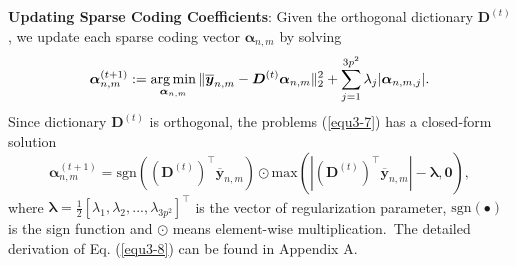 \vspace{2mm}
\textbf{Updating Sparse Coding Coefficients}: Given the orthogonal dictionary $\bm{D}^{(t)}$, we update each sparse coding vector $\bm{\alpha}_{n,m}$ by solving
\vspace{-2mm}
\begin{equation}\label{equ3-7}
\vspace{-2mm}
\begin{split}
\bm{\alpha}_{n,m}^{(t+1)}:=\argmin_{\bm{\alpha}_{n,m}}
\|\bm{\overline{y}}_{n,m}-\bm{D}^{(t)}\bm{\alpha}_{n,m}\|_{2}^{2}+\sum_{j=1}^{3p^{2}}\lambda_{j}|\bm{\alpha}_{n,m,j}|.
\end{split}
\end{equation}
Since dictionary $\bm{D}^{(t)}$ is orthogonal, the problems (\ref{equ3-7}) has a closed-form solution
\vspace{-2mm}
\begin{equation}\label{equ3-8}
\bm{\alpha}_{n,m}^{(t+1)}= \text{sgn}((\bm{D}^{(t)})^{\top}\bm{\overline{y}}_{n,m})\odot \text{max}(|(\bm{D}^{(t)})^{\top}\bm{\overline{y}}_{n,m}|-\bm{\lambda},\bm{0}),
\end{equation}
where $\bm{\lambda} = \frac{1}{2}[\lambda_{1},\lambda_{2},...,\lambda_{3p^2}]^{\top}$ is the vector of regularization parameter, $\text{sgn}(\bullet)$ is the sign function and $\odot$ means element-wise multiplication.\ The detailed derivation of Eq. (\ref{equ3-8}) can be found in Appendix A.
 
